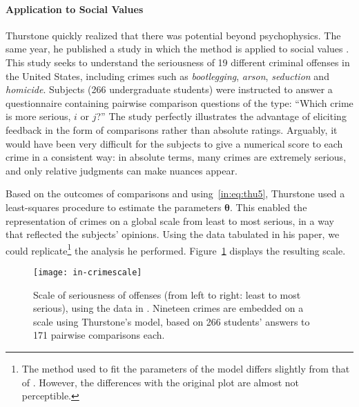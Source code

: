 \paragraph{Application to Social Values}
Thurstone quickly realized that there was potential beyond psychophysics.
The same year, he published a study in which the method is applied to social values \citep{thurstone1927method}.
This study seeks to understand the seriousness of \num{19} different criminal offenses in the United States, including crimes such as \emph{bootlegging}, \emph{arson}, \emph{seduction} and \emph{homicide}.
Subjects (266 undergraduate students) were instructed to answer a questionnaire containing pairwise comparison questions of the type: ``Which crime is more serious, $i$ or $j$?''
The study perfectly illustrates the advantage of eliciting feedback in the form of comparisons rather than absolute ratings.
Arguably, it would have been very difficult for the subjects to give a numerical score to each crime in a consistent way: in absolute terms, many crimes are extremely serious, and only relative judgments can make nuances appear.

Based on the outcomes of comparisons and using~\eqref{in:eq:thu5}, Thurstone used a least-squares procedure to estimate the parameters $\bm{\theta}$.
This enabled the representation of crimes on a global scale from least to most serious, in a way that reflected the subjects' opinions.
Using the data tabulated in his \citeyear{thurstone1927method} paper, we could replicate\footnote{%
The method used to fit the parameters of the model differs slightly from that of \citet{thurstone1927method}.
However, the differences with the original plot are almost not perceptible.} the analysis he performed.
Figure~\ref{in:fig:crimescale} displays the resulting scale.

\begin{figure}[ht]
\centering
\texttt{[image: in-crimescale]}
\caption{
Scale of seriousness of offenses (from left to right: least to most serious), using the data in \citet{thurstone1927method}.
Nineteen crimes are embedded on a scale using Thurstone's model, based on 266 students' answers to 171 pairwise comparisons each.
}
\label{in:fig:crimescale}
\end{figure}


